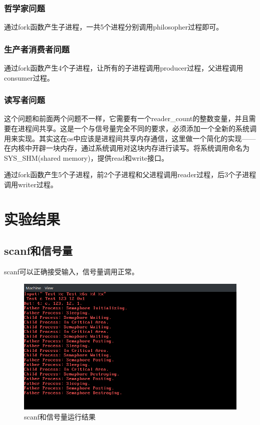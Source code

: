 \documentclass[12pt,a4paper,UTF8]{article}
\begin{document}
\subsubsection{哲学家问题}
通过fork函数产生子进程，一共5个进程分别调用philosopher过程即可。


\subsubsection{生产者消费者问题}
通过fork函数产生4个子进程，让所有的子进程调用producer过程，父进程调用consumer过程。


\subsubsection{读写者问题}
这个问题和前面两个问题不一样，它需要有一个reader\_count的整数变量，并且需要在进程间共享。这是一个与信号量完全不同的要求，必须添加一个全新的系统调用来实现。其实这在os中应该是进程间共享内存通信，这里做一个简化的实现——在内核中开辟一块内存，通过系统调用对这块内存进行读写。将系统调用命名为SYS\_SHM(shared memory)，提供read和write接口。

\par 通过fork函数产生5个子进程，前2个子进程和父进程调用reader过程，后3个子进程调用writer过程。


\section{实验结果}
\subsection{scanf和信号量}
scanf可以正确接受输入，信号量调用正常。
\begin{figure}[htbp]
	\centering
	\includegraphics[width=\textwidth]{scanfsem}
	\caption{scanf和信号量运行结果}
\end{figure}
\end{document}
